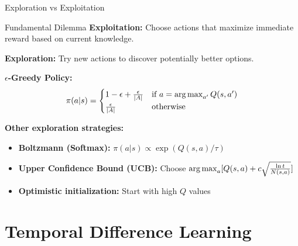 \documentclass[aspectratio=169]{beamer}
\begin{document}
\begin{frame}{Exploration vs Exploitation}
  \begin{alertbox}{Fundamental Dilemma}
    \textbf{Exploitation:} Choose actions that maximize immediate reward based on current knowledge.

    \textbf{Exploration:} Try new actions to discover potentially better options.
  \end{alertbox}

  \vspace{0.5em}

  \textbf{$\epsilon$-Greedy Policy:}
  $$\pi(a|s) = \begin{cases}
    1 - \epsilon + \frac{\epsilon}{|A|} & \text{if } a = \operatorname*{arg\,max}_{a'} Q(s,a') \\
    \frac{\epsilon}{|A|} & \text{otherwise}
  \end{cases}$$

  \vspace{0.5em}

  \textbf{Other exploration strategies:}
  \begin{itemize}
    \item \textbf{Boltzmann (Softmax):} $\pi(a|s) \propto \exp(Q(s,a)/\tau)$
    \item \textbf{Upper Confidence Bound (UCB):} Choose $\operatorname*{arg\,max}_a [Q(s,a) + c\sqrt{\frac{\ln t}{N(s,a)}}]$
    \item \textbf{Optimistic initialization:} Start with high $Q$ values
  \end{itemize}
\end{frame}

\section{Temporal Difference Learning}
\end{document}
